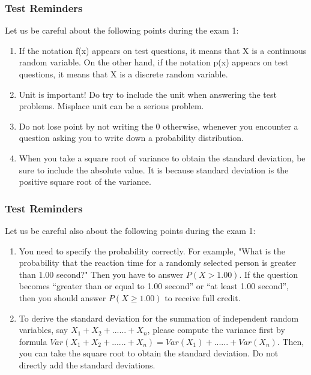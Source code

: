 \documentclass{beamer}
\begin{document}

\begin{frame}
\frametitle{Test Reminders}

Let us be careful about the following points during the exam 1:

\begin{enumerate}
\item If the notation f(x) appears on test questions, it means that X is a continuous random
variable. On the other hand, if the notation p(x) appears on test questions, it means that X is a discrete
random variable.
\item Unit is important! Do try to include the unit when answering the test problems. Misplace
unit can be a serious problem.
\item Do not lose point by not writing the 0 otherwise, whenever you encounter a question
asking you to write down a probability distribution.
\item When you take a square root of variance to obtain the standard deviation, be sure to
include the absolute value. It is because standard deviation is the positive square root of the variance.

\end{enumerate}
\end{frame}


\begin{frame}
\frametitle{Test Reminders}

Let us be careful also about the following points during the exam 1:

\begin{enumerate}
\item You need to specify the
probability correctly. For example, "What is the probability that the reaction time for a randomly selected person is greater than 1.00 second?" Then you have to answer $P(X > 1.00)$. If the question becomes “greater than or equal to 1.00 second”
or “at least 1.00 second”, then you should answer $P(X \ge 1.00)$ to receive full credit.
\item To derive the standard deviation for the summation of independent random variables, say $X_1+X_2+......+X_n$,
please compute the variance first by formula $Var(X_1 + X_2 + ...... + X_n) = Var(X_1) + ...... + Var(X_n)$.
Then, you can take the square root to obtain the standard deviation. Do not directly add the standard
deviations.

\end{enumerate}
\end{frame}
\end{document}
